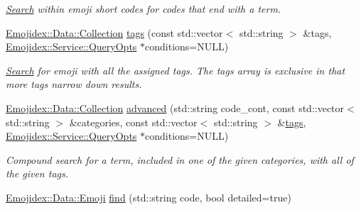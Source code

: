 \begin{DoxyCompactItemize}
\begin{DoxyCompactList}\small\item\em \hyperlink{classEmojidex_1_1Service_1_1Search}{Search} within emoji short codes for codes that end with a term. \end{DoxyCompactList}\item 
\hyperlink{classEmojidex_1_1Data_1_1Collection}{Emojidex\+::\+Data\+::\+Collection} \hyperlink{classEmojidex_1_1Service_1_1Search_af8d1aaece57cd92bf8712493055f2ef6}{tags} (const std\+::vector$<$ std\+::string $>$ \&tags, \hyperlink{classEmojidex_1_1Service_1_1QueryOpts}{Emojidex\+::\+Service\+::\+Query\+Opts} $\ast$conditions=N\+U\+LL)\hypertarget{classEmojidex_1_1Service_1_1Search_af8d1aaece57cd92bf8712493055f2ef6}{}\label{classEmojidex_1_1Service_1_1Search_af8d1aaece57cd92bf8712493055f2ef6}

\begin{DoxyCompactList}\small\item\em \hyperlink{classEmojidex_1_1Service_1_1Search}{Search} for emoji with all the assigned tags. The tags array is exclusive in that more tags narrow down results. \end{DoxyCompactList}\item 
\hyperlink{classEmojidex_1_1Data_1_1Collection}{Emojidex\+::\+Data\+::\+Collection} \hyperlink{classEmojidex_1_1Service_1_1Search_a2924585a8bb92c1b902477cabc154fb0}{advanced} (std\+::string code\+\_\+cont, const std\+::vector$<$ std\+::string $>$ \&categories, const std\+::vector$<$ std\+::string $>$ \&\hyperlink{classEmojidex_1_1Service_1_1Search_af8d1aaece57cd92bf8712493055f2ef6}{tags}, \hyperlink{classEmojidex_1_1Service_1_1QueryOpts}{Emojidex\+::\+Service\+::\+Query\+Opts} $\ast$conditions=N\+U\+LL)\hypertarget{classEmojidex_1_1Service_1_1Search_a2924585a8bb92c1b902477cabc154fb0}{}\label{classEmojidex_1_1Service_1_1Search_a2924585a8bb92c1b902477cabc154fb0}

\begin{DoxyCompactList}\small\item\em Compound search for a term, included in one of the given categories, with all of the given tags. \end{DoxyCompactList}\item 
\hyperlink{classEmojidex_1_1Data_1_1Emoji}{Emojidex\+::\+Data\+::\+Emoji} \hyperlink{classEmojidex_1_1Service_1_1Search_a80970b4a18e5bcc37a2a697de237e8aa}{find} (std\+::string code, bool detailed=true)
\end{DoxyCompactItemize}


